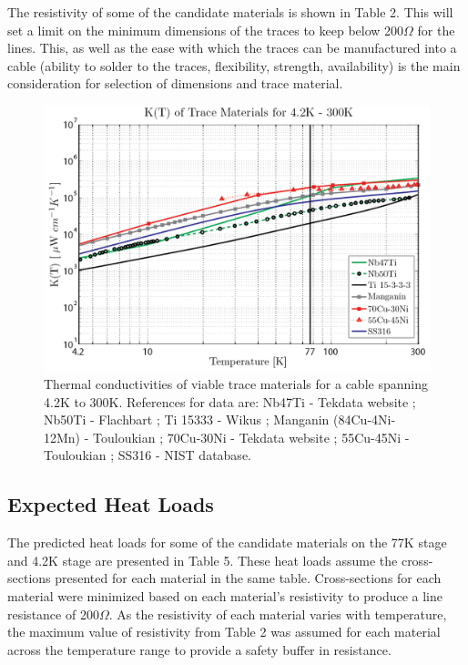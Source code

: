 \documentclass{report}
\begin{document}

The resistivity of some of the candidate materials is shown in Table 2. This will set a limit on the minimum dimensions of the traces to keep below 200$\Omega$ for the lines. This, as well as the ease with which the traces can be manufactured into a cable (ability to solder to the traces, flexibility, strength, availability) is the main consideration for selection of dimensions and trace material.

\begin{figure}
\includegraphics[width = .65\textwidth]{Trace_matl_300K.png}
\caption{Thermal conductivities of viable trace materials for a cable spanning 4.2K to 300K. References for data are: \newline Nb47Ti - Tekdata website ; Nb50Ti - Flachbart \cite{Flachbart1978} ; Ti 15333 - Wikus \cite{wik} ; Manganin (84Cu-4Ni-12Mn) - Touloukian \cite{tou} ; 70Cu-30Ni - Tekdata website ; 55Cu-45Ni - Touloukian \cite{tou} ; SS316 - NIST database.}
\end{figure}

\subsection{Expected Heat Loads}

The predicted heat loads for some of the candidate materials on the 77K stage and 4.2K stage are presented in Table 5. These heat loads assume the cross-sections presented for each material in the same table. Cross-sections for each material were minimized based on each material's resistivity to produce a line resistance of 200$\Omega$. As the resistivity of each material varies with temperature, the maximum value of resistivity from Table 2 was assumed for each material across the temperature range to provide a safety buffer in resistance.
\end{document}
